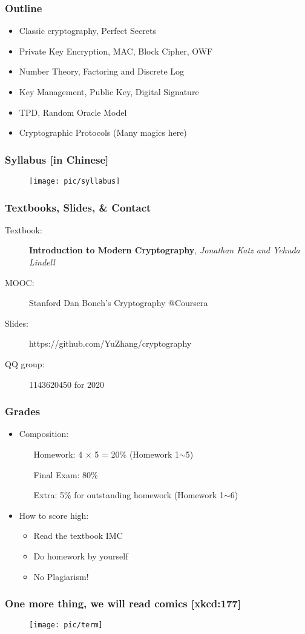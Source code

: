\begin{frame}\frametitle{Outline}
\begin{itemize}
\item Classic cryptography, Perfect Secrets
\item Private Key Encryption, MAC, Block Cipher, OWF
\item Number Theory, Factoring and Discrete Log
\item Key Management, Public Key, Digital Signature
\item TPD, Random Oracle Model
\item Cryptographic Protocols (Many magics here)
\end{itemize}
\end{frame}
\begin{frame}\frametitle{Syllabus [in Chinese]}
\begin{figure}
\begin{center}
\texttt{[image: pic/syllabus]} 
\end{center}
\end{figure}
\end{frame}
\begin{frame}\frametitle{Textbooks, Slides, \& Contact}
\begin{description} 
\item[Textbook:] \textbf{Introduction to Modern Cryptography}, \emph{Jonathan Katz and Yehuda Lindell} %
\item[MOOC:] Stanford Dan Boneh's Cryptography @Coursera
\item[Slides:] https://github.com/YuZhang/cryptography
\item[QQ group:] 1143620450 for 2020
\end{description}
\end{frame}
\begin{frame}\frametitle{Grades}
\begin{itemize}
\item Composition:
\begin{itemize}
\item[Homework:] 4 $\times$ 5 = 20\% (Homework 1$\sim$5)
\item[Final Exam:] 80\%
\item[Extra:]  5\% for outstanding homework (Homework 1$\sim$6)
\end{itemize}
\item How to score high:
\begin{itemize}
\item Read the textbook IMC
\item Do homework by yourself
\item \alert{No Plagiarism!} 
\end{itemize}
\end{itemize}
\end{frame}
\begin{frame}\frametitle{One more thing, we will read comics  [xkcd:177]}
\begin{figure}
\begin{center}
\texttt{[image: pic/term]} 
\end{center}
\end{figure}
\end{frame}

